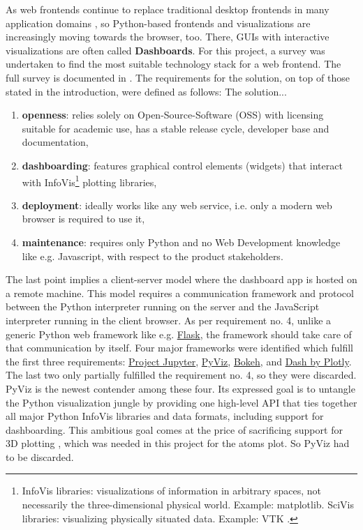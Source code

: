 As web frontends continue to replace traditional desktop frontends in many
application domains \cite{web-vs-desktop}, so Python-based frontends and
visualizations are increasingly moving towards the browser, too. There, GUIs
with interactive visualizations are often called \textbf{Dashboards}. For this
project, a survey was undertaken to find the most suitable technology stack for
a web frontend. The full survey is documented in \cite{jw-notes}. The
requirements for the solution, on top of those stated in the introduction, were
defined as follows: The solution...

\begin{enumerate}
\item \textbf{openness}: relies solely on Open-Source-Software (OSS) with
    licensing suitable for academic use, has a stable release cycle, developer
    base and documentation,
\item \textbf{dashboarding}: features graphical control elements (widgets) that
    interact with InfoVis\footnote{InfoVis libraries: visualizations of
      information in arbitrary spaces, not necessarily the three-dimensional
      physical world. Example: matplotlib. SciVis libraries: visualizing
      physically situated data. Example: VTK \cite{python-viz-2018}.} plotting
    libraries,
\item \textbf{deployment}: ideally works like any web service, i.e. only a
    modern web browser is required to use it,
\item \textbf{maintenance}: requires only Python and no Web Development
    knowledge like e.g. Javascript, with respect to the product stakeholders.
\end{enumerate}

The last point implies a client-server model where the dashboard app is hosted
on a remote machine. This model requires a communication framework and protocol
between the Python interpreter running on the server and the JavaScript
interpreter running in the client browser. As per requirement no. 4, unlike a
generic Python web framework like e.g. \href{http://flask.pocoo.org/}{Flask},
the framework should take care of that communication by itself. Four major
frameworks were identified which fulfill the first three requirements:
\href{https://jupyter.org/}{Project Jupyter}, \href{http://pyviz.org/}{PyViz},
\href{https://bokeh.pydata.org/en/latest/}{Bokeh}, and
\href{https://plot.ly/products/dash/}{Dash by Plotly}. The last two only
partially fulfilled the requirement no. 4, so they were discarded. PyViz is the
newest contender among these four. Its expressed goal is to untangle the Python
visualization jungle by providing one high-level API that ties together all
major Python InfoVis libraries and data formats, including support for
dashboarding. This ambitious goal comes at the price of sacrificing support for
3D plotting \cite{pyviz-faq}, which was needed in this project for the atoms
plot. So PyViz had to be discarded.

